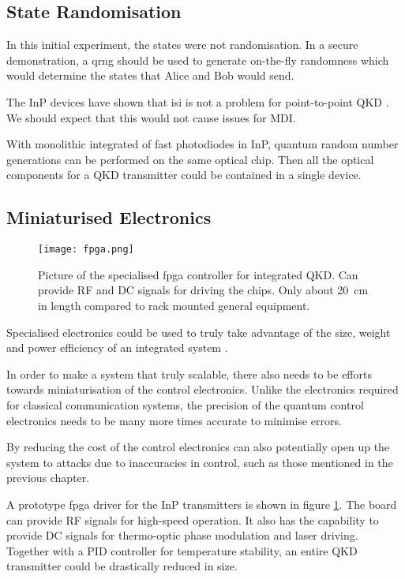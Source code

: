 \subsection{State Randomisation}

In this initial experiment, the states were not randomisation. In a secure demonstration, a \ac{qrng} should be used to generate on-the-fly randomness which would determine the states that Alice and Bob would send. 

The \ac{InP} devices have shown that \ac{isi} is not a problem for point-to-point \ac{QKD} \cite{Sibson2017InP}. We should expect that this would not cause issues for \ac{MDI}.

With monolithic integrated of fast photodiodes in \ac{InP}, quantum random number generations can be performed on the same optical chip. Then all the optical components for a \ac{QKD} transmitter could be contained in a single device.

\subsection{Miniaturised Electronics}

\begin{figure}[t]
	\centering
	\texttt{[image: fpga.png]}
	\caption[Picture of the specialised FPGA controller for integrated QKD]{Picture of the specialised \ac{fpga} controller for integrated QKD. Can provide RF and DC signals for driving the chips. Only about \SI{20}{\cm} in length compared to rack mounted general equipment.}
	\label{fig:fpga}
\end{figure}

Specialised electronics could be used to truly take advantage of the size, weight and power efficiency of an integrated system \cite{valivarthi2017}.

In order to make a system that truly scalable, there also needs to be efforts towards miniaturisation of the control electronics. Unlike the electronics required for classical communication systems, the precision of the quantum control electronics needs to be many more times accurate to minimise errors.

By reducing the cost of the control electronics can also potentially open up the system to attacks due to inaccuracies in control, such as those mentioned in the previous chapter. 

A prototype \ac{fpga} driver for the \ac{InP} transmitters is shown in figure \ref{fig:fpga}. The board can provide RF signals for high-speed operation. It also has the capability to provide DC signals for thermo-optic phase modulation and laser driving. Together with a PID controller for temperature stability, an entire \ac{QKD} transmitter could be drastically reduced in size.

